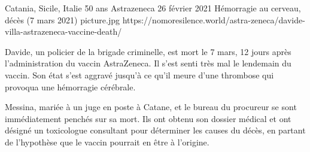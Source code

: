 {Catania, Sicile, Italie}
{50 ans}
{Astrazeneca}
{26 février 2021}
{Hémorragie au cerveau, décès (7 mars 2021)}
{picture.jpg}
{https://nomoresilence.world/astra-zeneca/davide-villa-astrazeneca-vaccine-death/}
{

Davide, un policier de la brigade criminelle, est mort le 7 mars, 12 jours après
l'administration du vaccin AstraZeneca. Il s'est senti très mal le lendemain du
vaccin. Son état s'est aggravé jusqu'à ce qu'il meure d'une thrombose qui
provoqua une hémorragie cérébrale.

Messina, mariée à un juge en poste à Catane, et le bureau du procureur se sont
immédiatement penchés sur sa mort. Ils ont obtenu son dossier médical et ont
désigné un toxicologue consultant pour déterminer les causes du décès, en
partant de l'hypothèse que le vaccin pourrait en être à l'origine.

}
